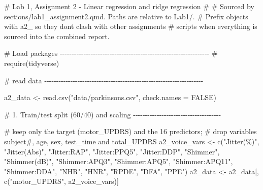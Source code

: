 \documentclass[
  english,
  11pt,
]{article}
\newenvironment{Shaded}{\begin{snugshade}}{\end{snugshade}}
\newcommand{\AttributeTok}[1]{\textcolor[rgb]{0.40,0.45,0.13}{#1}}
\newcommand{\CommentTok}[1]{\textcolor[rgb]{0.37,0.37,0.37}{#1}}
\newcommand{\ConstantTok}[1]{\textcolor[rgb]{0.56,0.35,0.01}{#1}}
\newcommand{\FunctionTok}[1]{\textcolor[rgb]{0.28,0.35,0.67}{#1}}
\newcommand{\NormalTok}[1]{\textcolor[rgb]{0.00,0.23,0.31}{#1}}
\newcommand{\OtherTok}[1]{\textcolor[rgb]{0.00,0.23,0.31}{#1}}
\newcommand{\StringTok}[1]{\textcolor[rgb]{0.13,0.47,0.30}{#1}}
\begin{document}
\begin{Shaded}
\begin{Highlighting}[]
\CommentTok{\# Lab 1, Assignment 2 {-} Linear regression and ridge regression}
\CommentTok{\#}
\CommentTok{\# Sourced by sections/lab1\_assignment2.qmd. Paths are relative to Lab1/.}
\CommentTok{\# Prefix objects with a2\_ so they don\textquotesingle{}t clash with other assignments\textquotesingle{}}
\CommentTok{\# scripts when everything is sourced into the combined report.}

\CommentTok{\# Load packages {-}{-}{-}{-}{-}{-}{-}{-}{-}{-}{-}{-}{-}{-}{-}{-}{-}{-}{-}{-}{-}{-}{-}{-}{-}{-}{-}{-}{-}{-}{-}{-}{-}{-}{-}{-}{-}{-}{-}{-}{-}{-}{-}{-}{-}{-}{-}{-}{-}{-}{-}{-}{-}{-}{-}{-}{-}{-}{-}{-}{-}{-}{-}}
\CommentTok{\# require(tidyverse)}


\CommentTok{\# read data {-}{-}{-}{-}{-}{-}{-}{-}{-}{-}{-}{-}{-}{-}{-}{-}{-}{-}{-}{-}{-}{-}{-}{-}{-}{-}{-}{-}{-}{-}{-}{-}{-}{-}{-}{-}{-}{-}{-}{-}{-}{-}{-}{-}{-}{-}{-}{-}{-}{-}{-}{-}{-}{-}{-}{-}{-}{-}{-}{-}{-}{-}{-}{-}{-}{-}{-}}

\NormalTok{a2\_data }\OtherTok{\textless{}{-}} \FunctionTok{read.csv}\NormalTok{(}\StringTok{"data/parkinsons.csv"}\NormalTok{, }\AttributeTok{check.names =} \ConstantTok{FALSE}\NormalTok{)}

\CommentTok{\# 1. Train/test split (60/40) and scaling {-}{-}{-}{-}{-}{-}{-}{-}{-}{-}{-}{-}{-}{-}{-}{-}{-}{-}{-}{-}{-}{-}{-}{-}{-}{-}{-}{-}{-}{-}{-}{-}{-}{-}{-}{-}{-}}

\CommentTok{\# keep only the target (motor\_UPDRS) and the 16 predictors;}
\CommentTok{\# drop variables subject\#, age, sex, test\_time and total\_UPDRS}
\NormalTok{a2\_voice\_vars }\OtherTok{\textless{}{-}} \FunctionTok{c}\NormalTok{(}\StringTok{"Jitter(\%)"}\NormalTok{, }\StringTok{"Jitter(Abs)"}\NormalTok{, }\StringTok{"Jitter:RAP"}\NormalTok{, }\StringTok{"Jitter:PPQ5"}\NormalTok{,}
                   \StringTok{"Jitter:DDP"}\NormalTok{, }\StringTok{"Shimmer"}\NormalTok{, }\StringTok{"Shimmer(dB)"}\NormalTok{, }\StringTok{"Shimmer:APQ3"}\NormalTok{,}
                   \StringTok{"Shimmer:APQ5"}\NormalTok{, }\StringTok{"Shimmer:APQ11"}\NormalTok{, }\StringTok{"Shimmer:DDA"}\NormalTok{,}
                   \StringTok{"NHR"}\NormalTok{, }\StringTok{"HNR"}\NormalTok{, }\StringTok{"RPDE"}\NormalTok{, }\StringTok{"DFA"}\NormalTok{, }\StringTok{"PPE"}\NormalTok{)}
\NormalTok{a2\_data }\OtherTok{\textless{}{-}}\NormalTok{ a2\_data[, }\FunctionTok{c}\NormalTok{(}\StringTok{"motor\_UPDRS"}\NormalTok{, a2\_voice\_vars)]}


\end{Highlighting}
\end{Shaded}
\end{document}
